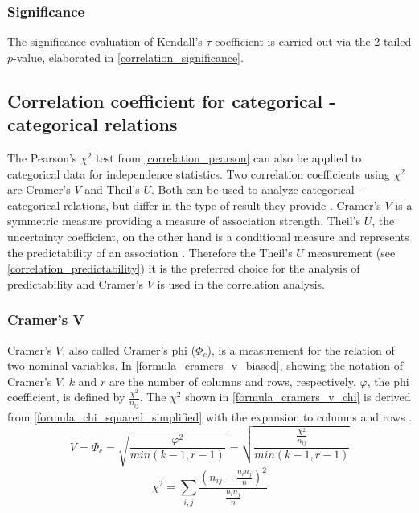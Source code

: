 \subsubsection{Significance}
The significance evaluation of Kendall's $\tau$ coefficient is carried out via the 2-tailed $p$-value, elaborated in \cref{correlation_significance}.

\subsection{Correlation coefficient for categorical - categorical relations}
The Pearson's $\chi^2$ test from \cref{correlation_pearson} can also be applied to categorical data for independence statistics. Two correlation coefficients using $\chi^2$ are Cramer’s $V$ and Theil’s $U$. Both can be used to analyze categorical - categorical relations, but differ in the type of result they provide \parencite{OutsideTwoStandardDeviations2018}. Cramer’s $V$ is a symmetric measure providing a measure of association strength. Theil’s $U$, the uncertainty coefficient, on the other hand is a conditional measure and represents the predictability of an association \parencite{Akoglu2018,StackExchange2020}. Therefore the Theil’s $U$ measurement (see \cref{correlation_predictability}) it is the preferred choice for the analysis of predictability and Cramer’s $V$ is used in the correlation analysis.

\subsubsection{Cramer’s V}

Cramer’s $V$, also called Cramer's phi ($\Phi_c$), is a measurement for the relation of two nominal variables. In \cref{formula_cramers_v_biased}, showing the notation of Cramer’s $V$, $k$ and $r$ are the number of columns and rows, respectively. $\varphi$, the phi coefficient, is defined by $\frac{{\chi^2}}{n_{ij}}$. The $\chi^2$ shown in \cref{formula_cramers_v_chi} is derived from \cref{formula_chi_squared_simplified} with the expansion to columns and rows \parencite{Sheskin1997,Bergsma2013}.
\smallskip
\begin{equation}
\label{formula_cramers_v_biased}
	V = \Phi_c =  \sqrt{\frac{{\varphi^2}}{min(k-1,r-1)}} = \sqrt{\frac{\frac{{\chi^2}}{n_{ij}}}{min(k-1,r-1)}}
\end{equation}
\begin{equation}
\label{formula_cramers_v_chi}
	\chi^2 =  \sum_{i,j}{\frac{\left(n_{ij}-\frac{n_i n_j}{n}\right)^2}{\frac{n_i n_j}{n}}}
\end{equation}

